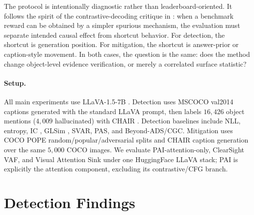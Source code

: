 \documentclass[letterpaper]{article} \usepackage[submission]{aaai2027}  \usepackage[hyphens]{url}  \usepackage{graphicx} \urlstyle{rm} \def\UrlFont{\rm}  \usepackage{natbib}  \usepackage{caption} \frenchspacing
\begin{document}
The protocol is intentionally diagnostic rather than leaderboard-oriented. It follows the spirit of the contrastive-decoding critique in \citet{yin2025mirage}: when a benchmark reward can be obtained by a simpler spurious mechanism, the evaluation must separate intended causal effect from shortcut behavior. For detection, the shortcut is generation position. For mitigation, the shortcut is answer-prior or caption-style movement. In both cases, the question is the same: does the method change object-level evidence verification, or merely a correlated surface statistic?

\paragraph{Setup.} All main experiments use LLaVA-1.5-7B \cite{liu2023llava}. Detection uses MSCOCO val2014 \cite{lin2014coco} captions generated with the standard LLaVA prompt, then labels $16{,}426$ object mentions ($4{,}009$ hallucinated) with CHAIR \cite{rohrbach2018chair}. Detection baselines include NLL, entropy, IC \cite{jiang2024interpreting}, GLSim \cite{park2025glsim}, SVAR, PAS, and Beyond-ADS/CGC. Mitigation uses COCO POPE random/popular/adversarial splits and CHAIR caption generation over the same $5{,}000$ COCO images. We evaluate PAI-attention-only, ClearSight VAF, and Visual Attention Sink under one HuggingFace LLaVA stack; PAI is explicitly the attention component, excluding its contrastive/CFG branch.
 \section{Detection Findings}
\label{sec:results}
\end{document}
